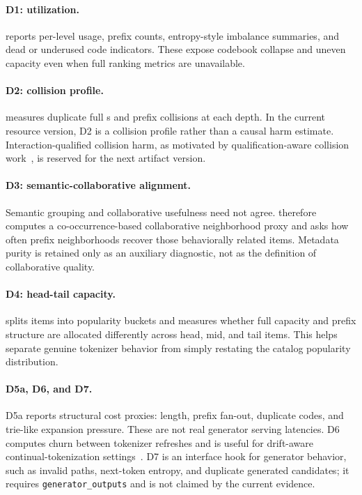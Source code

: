 \paragraph{D1: utilization.}
\tool reports per-level usage, prefix counts, entropy-style imbalance
summaries, and dead or underused code indicators. These expose codebook
collapse and uneven capacity even when full ranking metrics are unavailable.

\paragraph{D2: collision profile.}
\tool measures duplicate full \sid{}s and prefix collisions at each depth. In
the current resource version, D2 is a collision profile rather than a causal
harm estimate. Interaction-qualified collision harm, as motivated by
qualification-aware collision work~\cite{hu2026quasid}, is reserved for the
next artifact version.

\paragraph{D3: semantic-collaborative alignment.}
Semantic grouping and collaborative usefulness need not agree. \tool therefore
computes a co-occurrence-based collaborative neighborhood proxy and asks how
often prefix neighborhoods recover those behaviorally related items. Metadata
purity is retained only as an auxiliary diagnostic, not as the definition of
collaborative quality.

\paragraph{D4: head-tail capacity.}
\tool splits items into popularity buckets and measures whether full \sid
capacity and prefix structure are allocated differently across head, mid, and
tail items. This helps separate genuine tokenizer behavior from simply
restating the catalog popularity distribution.

\paragraph{D5a, D6, and D7.}
D5a reports structural cost proxies: \sid length, prefix fan-out, duplicate
codes, and trie-like expansion pressure. These are not real generator serving
latencies. D6 computes churn between tokenizer refreshes and is useful for
drift-aware continual-tokenization settings~\cite{feng2026dact}. D7 is an
interface hook for generator behavior, such as invalid paths, next-token
entropy, and duplicate generated candidates; it requires
\texttt{generator\_outputs} and is not claimed by the current evidence.

